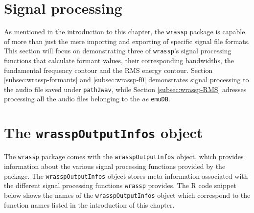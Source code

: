 \documentclass[]{book}
\newenvironment{Shaded}{\begin{snugshade}}{\end{snugshade}}
\newcommand{\CommentTok}[1]{\textcolor[rgb]{0.56,0.35,0.01}{\textit{#1}}}
\newcommand{\FloatTok}[1]{\textcolor[rgb]{0.00,0.00,0.81}{#1}}
\newcommand{\KeywordTok}[1]{\textcolor[rgb]{0.13,0.29,0.53}{\textbf{#1}}}
\newcommand{\NormalTok}[1]{#1}
\newcommand{\OperatorTok}[1]{\textcolor[rgb]{0.81,0.36,0.00}{\textbf{#1}}}
\newcommand{\StringTok}[1]{\textcolor[rgb]{0.31,0.60,0.02}{#1}}
\theoremstyle{definition}
\theoremstyle{definition}
\theoremstyle{definition}
\theoremstyle{remark}
\begin{document}
\begin{Shaded}
\end{Shaded}

\hypertarget{signal-processing}{%
\section{Signal processing}\label{signal-processing}}

As mentioned in the introduction to this chapter, the \texttt{wrassp}
package is capable of more than just the mere importing and exporting of
specific signal file formats. This section will focus on demonstrating
three of \texttt{wrassp}'s signal processing functions that calculate
formant values, their corresponding bandwidths, the fundamental
frequency contour and the RMS energy contour. Section
\ref{subsec:wrassp-formants} and \ref{subsec:wrassp-f0} demonstrates
signal processing to the audio file saved under \texttt{path2wav}, while
Section \ref{subsec:wrassp-RMS} adresses processing all the audio files
belonging to the \emph{ae} \texttt{emuDB}.

\hypertarget{subsec:wrassp-wrasspOutputInfos}{%
\section{\texorpdfstring{The \texttt{wrasspOutputInfos}
object}{The wrasspOutputInfos object}}\label{subsec:wrassp-wrasspOutputInfos}}

The \texttt{wrassp} package comes with the \texttt{wrasspOutputInfos}
object, which provides information about the various signal processing
functions provided by the package. The \texttt{wrasspOutputInfos} object
stores meta information associated with the different signal processing
functions \texttt{wrassp} provides. The R code snippet below shows the
names of the \texttt{wrasspOutputInfos} object which correspond to the
function names listed in the introduction of this chapter.
\end{document}
